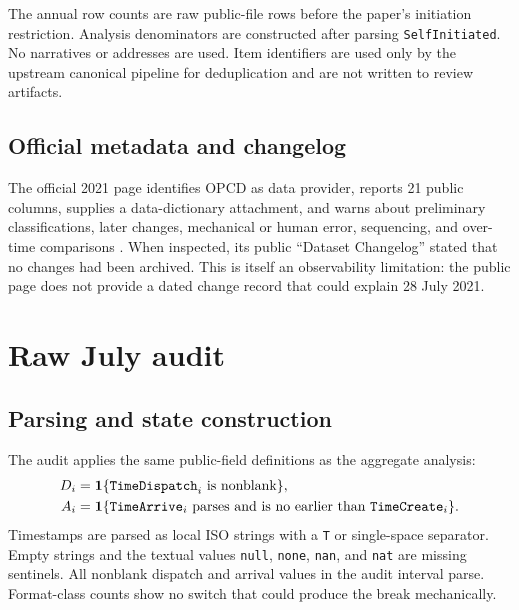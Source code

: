 \documentclass[11pt]{article}
\begin{document}
The annual row counts are raw public-file rows before the paper's initiation restriction. Analysis denominators are constructed after parsing \texttt{SelfInitiated}. No narratives or addresses are used. Item identifiers are used only by the upstream canonical pipeline for deduplication and are not written to review artifacts.

\subsection{Official metadata and changelog}

The official 2021 page identifies OPCD as data provider, reports 21 public columns, supplies a data-dictionary attachment, and warns about preliminary classifications, later changes, mechanical or human error, sequencing, and over-time comparisons \citep{DataNOLA2021}. When inspected, its public ``Dataset Changelog'' stated that no changes had been archived. This is itself an observability limitation: the public page does not provide a dated change record that could explain 28 July 2021.

\section{Raw July audit}

\subsection{Parsing and state construction}

The audit applies the same public-field definitions as the aggregate analysis:
\begin{align}
D_i &= \mathbf{1}\{\texttt{TimeDispatch}_i \text{ is nonblank}\},\\
A_i &= \mathbf{1}\{\texttt{TimeArrive}_i \text{ parses and is no earlier than }\texttt{TimeCreate}_i\}.
\end{align}
Timestamps are parsed as local ISO strings with a \texttt{T} or single-space separator. Empty strings and the textual values \texttt{null}, \texttt{none}, \texttt{nan}, and \texttt{nat} are missing sentinels. All nonblank dispatch and arrival values in the audit interval parse. Format-class counts show no switch that could produce the break mechanically.
\end{document}

